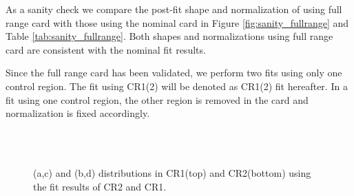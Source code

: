 As a sanity check we compare the post-fit shape and normalization of \qqww{}
using full range card with those using the nominal card in Figure \ref{fig:sanity_fullrange} and 
Table \ref{tab:sanity_fullrange}. Both shapes and normalizations using full range card 
are consistent with the nominal fit results. 

Since the full range card has been validated, we perform two fits using only one control region.
The fit using CR1(2) will be denoted as CR1(2) fit hereafter. In a fit using one control region, 
the other region is removed in the card and normalization is fixed accordingly. 

\begin{figure}[!hbtp]
\centering
{}
\\
\\
\caption{\mll(a,c) and \mT(b,d) distributions in CR1(top) and CR2(bottom) 
using the fit results of CR2 and CR1.}
\label{fig:wwctl_final}
\end{figure}

